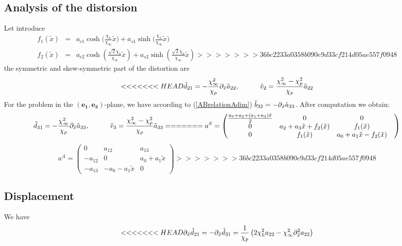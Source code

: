 \documentclass[
10pt, %
a4paper, %
oneside, %
headinclude,footinclude, %
table
]{scrartcl}
\begin{document}
\begin{itemize}
\subsection{Analysis of the distorsion}
Let introduce
$$
\begin{array}{rcl}
f_{1}(\tilde{x})	&=&	a_{c1}\cosh{(\frac{\chi_{h}}{\chi_{\infty}}\tilde{x}})+a_{s1}\sinh{(\frac{\chi_{h}}{\chi_{\infty}}\tilde{x}})\\
f_{2}(\tilde{x})	&=&	a_{c2} \cosh (\frac{\sqrt{2} 
   \chi _h}{\chi _{\infty }}\tilde{x})+a_{s2} \sinh (\frac{\sqrt{2} \chi _h}{\chi
   _{\infty }}\tilde{x}) 
>>>>>>> 36bc2233a0358b090e9d33cf214d05ae557f0948
\end{array}
$$
the symmetric and skew-symmetric part of the distortion are
$$
<<<<<<< HEAD
\tilde{d}_{21}=-\frac{\chi _{\infty }^2}{\chi _p}\partial_{\tilde{x}}\tilde{a}_{22},
\quad\quad\quad
\tilde{v}_2 =\frac{\chi _{\infty}^2-\chi _p^2}{\chi _p}\tilde{a}_{22}
$$
For the problem in the $(\boldsymbol{e_{1}},\boldsymbol{e_{3}})$-plane, we have according to 
(\ref{ABrelationAdim}) $\tilde{b}_{32}=- \partial_{\tilde{x}}\tilde{a}_{33}$. After computation we 
obtain:
$$
\tilde{d}_{31}=-\frac{\chi _{\infty }^2}{\chi _p}\partial_{\tilde{x}}\tilde{a}_{33},
\quad\quad\quad
\tilde{v}_3 =\frac{\chi _{\infty}^2-\chi _p^2}{\chi _p}\tilde{a}_{33}
=======
a^{S}=\begin{pmatrix}
\frac{a_{0}+a_{2}+(a_{1}+a_{3})\tilde{x}}{2}&0&0\\
0	&a_{2}+a_{3}\tilde{x}+f_{2}(\tilde{x})&f_{1}(\tilde{x})\\
0	&f_{1}(\tilde{x})		&	a_{0}+a_{1}\tilde{x}-f_{2}(\tilde{x})&\end{pmatrix}
$$
$$
a^{A}=\begin{pmatrix}
0&a_{12}&a_{13}\\
-a_{12}&0	&a_{0}+a_{1}\tilde{x}\\
-a_{13}&-a_{0}-a_{1}\tilde{x}	&0\end{pmatrix}
>>>>>>> 36bc2233a0358b090e9d33cf214d05ae557f0948
$$
\subsection{Displacement}
We have
$$
<<<<<<< HEAD
\partial_{\tilde{x}}\tilde{d}_{21}=-\partial_{\tilde{x}}\tilde{d}_{31}=\frac{1}{\chi_{p}}\left( 
2\chi_{h}^2a_{22}-\chi_{\infty}^2\partial_{\tilde{x}}^2a_{22}\right)
$$ 
\end{itemize}
\end{document}
